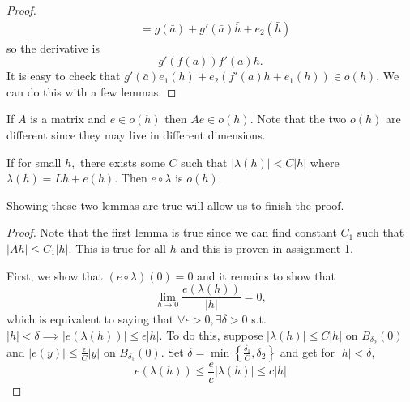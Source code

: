\begin{itemize}
\begin{proof}
\begin{align}
            &=g(\bar{a}) + g'(\bar{a})\bar{h} + e_2(\bar{h})
        \end{align}
        so the derivative is 
        \begin{equation}
            g'(f(a))f'(a)h.
        \end{equation}
        It is easy to check that $g'(\bar{a})e_1(h)+e_2(f'(a)h+e_1(h)) \in o(h).$ We can do this with a few lemmas.
    \end{proof}
    \begin{lemma}
        If $A$ is a matrix and $e\in o(h)$ then $Ae \in o(h).$ Note that the two $o(h)$ are different since they may live in different dimensions.        
    \end{lemma}
    \begin{lemma}
        If for small $h,$ there exists some $C$ such that $|\lambda(h)| < C|h|$ where $\lambda(h) = Lh + e(h).$ Then $e\circ \lambda$ is $o(h)$.
    \end{lemma}
    Showing these two lemmas are true will allow us to finish the proof.
    \begin{proof}
        Note that the first lemma is true since we can find constant $C_1$ such that $|Ah| \le C_1|h|.$ This is true for all $h$ and this is proven in assignment 1.
        \vspace{2mm}

        First, we show that $(e\circ \lambda)(0) = 0$ and it remains to show that 
        \begin{equation}
            \lim_{h\to 0} \frac{e(\lambda(h))}{|h|} = 0,
        \end{equation}
        which is equivalent to saying that $\forall \epsilon > 0, \exists \delta > 0$ s.t. $|h| <\delta \implies |e(\lambda(h))| \le \epsilon |h|.$ To do this, suppose $|\lambda(h)| \le C|h|$ on $B_{\delta_2}(0)$ and $|e(y)| \le \frac{\epsilon}{C}|y|$ on $B_{\delta_1}(0).$ Set $\delta=\min\left\{\frac{\delta_1}{C},\delta_2\right\}$ and get for $|h| < \delta$, 
        \begin{equation}
            e(\lambda(h)) \le \frac{e}{c}|\lambda(h)| \le c|h|
        \end{equation}
    \end{proof}
\end{itemize}